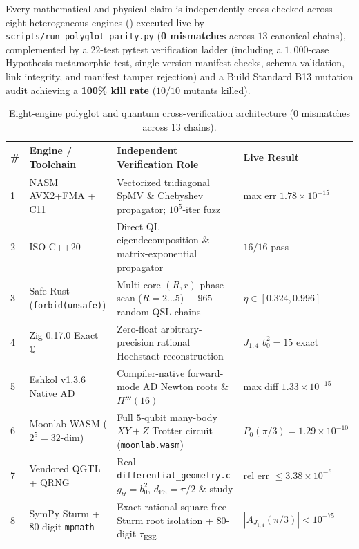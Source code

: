 \documentclass[11pt,reqno]{amsart}
\theoremstyle{definition}
\newcommand{\Q}{\mathbb{Q}}
\newcommand{\id}[1]{\textnormal{\texttt{\small #1}}}
\begin{document}
Every mathematical and physical claim is independently cross-checked across eight heterogeneous engines () executed live by \id{scripts/run\_polyglot\_parity.py} (\textbf{0 mismatches} across $13$ canonical chains), complemented by a $22$-test pytest verification ladder (including a $1{,}000$-case Hypothesis metamorphic test, single-version manifest checks, schema validation, link integrity, and manifest tamper rejection) and a Build Standard B13 mutation audit achieving a \textbf{100\% kill rate} ($10/10$ mutants killed).

\begin{table}[t]
\centering
\caption{Eight-engine polyglot and quantum cross-verification architecture (0 mismatches across 13 chains).}
\label{tab:engines}
\footnotesize
\setlength{\tabcolsep}{4pt}
\begin{tabularx}{\textwidth}{@{}ll>{\raggedright\arraybackslash}Xl@{}}
\toprule
\textbf{\#} & \textbf{Engine / Toolchain} & \textbf{Independent Verification Role} & \textbf{Live Result} \\
\midrule
1 & NASM AVX2+FMA + C11 & Vectorized tridiagonal SpMV \& Chebyshev propagator; $10^5$-iter fuzz & max err $1.78\times 10^{-15}$ \\
2 & ISO C++20 & Direct QL eigendecomposition \& matrix-exponential propagator & $16/16$ pass \\
3 & Safe Rust (\texttt{forbid(unsafe)}) & Multi-core $(R,r)$ phase scan ($R=2\dots 5$) + $965$ random QSL chains & $\eta\in[0.324,0.996]$ \\
4 & Zig 0.17.0 Exact $\Q$ & Zero-float arbitrary-precision rational Hochstadt reconstruction & $J_{1,4}$ $b_0^2=15$ exact \\
5 & Eshkol v1.3.6 Native AD & Compiler-native forward-mode AD Newton roots \& $H'''(16)$ & max diff $1.33\times 10^{-15}$ \\
6 & Moonlab WASM ($2^5=32$-dim) & Full $5$-qubit many-body $XY+Z$ Trotter circuit (\texttt{moonlab.wasm}) & $P_0(\pi/3)=1.29\times 10^{-10}$ \\
7 & Vendored QGTL + QRNG & Real \texttt{differential\_geometry.c} $g_{tt}=b_0^2$, $d_{\mathrm{FS}}=\pi/2$ \& study & rel err $\le 3.38\times 10^{-6}$ \\
8 & SymPy Sturm + 80-digit \texttt{mpmath} & Exact rational square-free Sturm root isolation + $80$-digit $\tau_{\mathrm{ESE}}$ & $|A_{J_{1,4}}(\pi/3)|<10^{-75}$ \\
\bottomrule
\end{tabularx}
\end{table}
\end{document}
